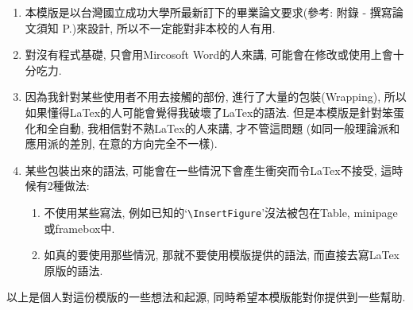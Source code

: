\begin{enumerate}

  \item
  {
    本模版是以台灣國立成功大學所最新訂下的畢業論文要求(參考: 附錄 - 撰寫論文須知 P.)來設計, 所以不一定能對非本校的人有用.
  } %

  \item
  {
    對沒有程式基礎, 只會用Mircosoft Word的人來講, 可能會在修改或使用上會十分吃力.
  } %

  \item
  {
    因為我針對某些使用者不用去接觸的部份, 進行了大量的包裝(Wrapping), 所以如果懂得LaTex的人可能會覺得我破壞了LaTex的語法. 但是本模版是針對笨蛋化和全自動, 我相信對不熟LaTex的人來講, 才不管這問題 (如同一般理論派和應用派的差別, 在意的方向完全不一樣).
  } %

  \item
  {
    某些包裝出來的語法, 可能會在一些情況下會產生衝突而令LaTex不接受, 這時候有2種做法:
    \begin{enumerate}
      \item
      {
        不使用某些寫法, 例如已知的`\verb|\InsertFigure|'沒法被包在Table, minipage或framebox中.
      } %

      \item
      {
        如真的要使用那些情況, 那就不要使用模版提供的語法, 而直接去寫LaTex原版的語法.
      } %
    \end{enumerate}
  } %
\end{enumerate}



以上是個人對這份模版的一些想法和起源, 同時希望本模版能對你提供到一些幫助.

\EndChapter
